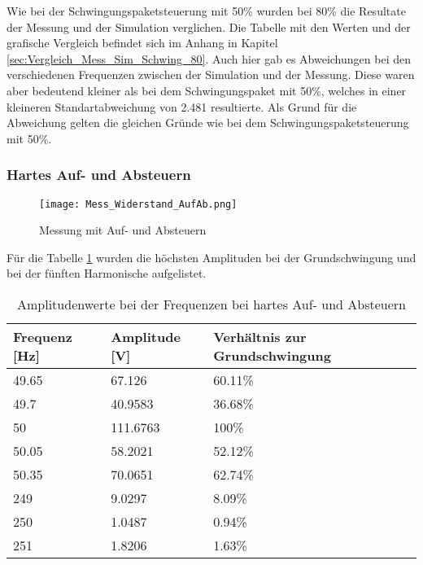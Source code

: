 Wie bei der Schwingungspaketsteuerung mit 50\% wurden bei 80\% die Resultate der Messung und der Simulation verglichen. Die Tabelle mit den Werten und der grafische Vergleich befindet sich im Anhang in Kapitel \ref{sec:Vergleich_Mess_Sim_Schwing_80}. Auch hier gab es Abweichungen bei den verschiedenen Frequenzen zwischen der Simulation und der Messung. Diese waren aber bedeutend kleiner als bei dem Schwingungspaket mit 50\%, welches in einer kleineren Standartabweichung von 2.481 resultierte. Als Grund für die Abweichung gelten die gleichen Gründe wie bei dem Schwingungspaketsteuerung mit 50\%.



\newpage
\subsubsection*{Hartes Auf- und Absteuern}
\begin{figure}[ht!]
	\centering
	\texttt{[image: Mess\_Widerstand\_AufAb.png]}	
	\caption{Messung mit Auf- und Absteuern}\label{fig:Mess_Sanft}
\end{figure}

Für die Tabelle \ref{tab:Mess_Spannung_AufAb_hart} wurden die höchsten Amplituden bei der Grundschwingung und bei der fünften Harmonische aufgelistet.

\begin{table}[ht!]
	\centering
	\begin{tabular}{|l|l|l|}
		\hline
		Frequenz {[}Hz{]} & Amplitude {[}V{]} & Verhältnis zur Grundschwingung \\ \hline
		49.65             & 67.126            & 60.11\%                        \\ \hline
		49.7              & 40.9583           & 36.68\%                        \\ \hline
		50                & 111.6763          & 100\%                          \\ \hline
		50.05             & 58.2021           & 52.12\%                        \\ \hline
		50.35             & 70.0651           & 62.74\%                        \\ \hline
		249               & 9.0297            & 8.09\%                         \\ \hline
		250               & 1.0487            & 0.94\%                         \\ \hline
		251 		      & 1.8206            & 1.63\%                         \\ \hline
	\end{tabular}
\caption{Amplitudenwerte bei der Frequenzen bei hartes Auf- und Absteuern}\label{tab:Mess_Spannung_AufAb_hart}
\end{table}


